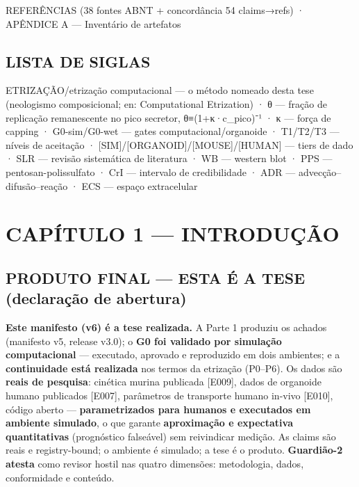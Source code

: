 \documentclass[
  10pt,
]{article}
\begin{document}
REFERÊNCIAS (38 fontes ABNT + concordância 54 claims→refs) · APÊNDICE A
--- Inventário de artefatos

\hypertarget{lista-de-siglas}{%
\subsection{LISTA DE SIGLAS}\label{lista-de-siglas}}

ETRIZAÇÃO/etrização computacional --- o método nomeado desta tese
(neologismo composicional; en: Computational Etrization) · θ --- fração
de replicação remanescente no pico secretor, θ≡(1+κ·c\_pico)⁻¹ · κ ---
força de capping · G0-sim/G0-wet --- gates computacional/organoide ·
T1/T2/T3 --- níveis de aceitação ·
{[}SIM{]}/{[}ORGANOID{]}/{[}MOUSE{]}/{[}HUMAN{]} --- tiers de dado · SLR
--- revisão sistemática de literatura · WB --- western blot · PPS ---
pentosan-polissulfato · CrI --- intervalo de credibilidade · ADR ---
advecção--difusão--reação · ECS --- espaço extracelular

\hypertarget{capuxedtulo-1-introduuxe7uxe3o}{%
\section{CAPÍTULO 1 ---
INTRODUÇÃO}\label{capuxedtulo-1-introduuxe7uxe3o}}

\hypertarget{produto-final-esta-uxe9-a-tese-declarauxe7uxe3o-de-abertura}{%
\subsection{PRODUTO FINAL --- ESTA É A TESE (declaração de
abertura)}\label{produto-final-esta-uxe9-a-tese-declarauxe7uxe3o-de-abertura}}

\textbf{Este manifesto (v6) é a tese realizada.} A Parte 1 produziu os
achados (manifesto v5, release v3.0); o \textbf{G0 foi validado por
simulação computacional} --- executado, aprovado e reproduzido em dois
ambientes; e a \textbf{continuidade está realizada} nos termos da
etrização (P0--P6). Os dados são \textbf{reais de pesquisa}: cinética
murina publicada {[}E009{]}, dados de organoide humano publicados
{[}E007{]}, parâmetros de transporte humano in-vivo {[}E010{]}, código
aberto --- \textbf{parametrizados para humanos e executados em ambiente
simulado}, o que garante \textbf{aproximação e expectativa
quantitativas} (prognóstico falseável) sem reivindicar medição. As
claims são reais e registry-bound; o ambiente é simulado; a tese é o
produto. \textbf{Guardião-2 atesta} como revisor hostil nas quatro
dimensões: metodologia, dados, conformidade e conteúdo.
\end{document}
